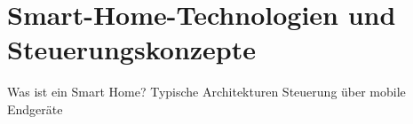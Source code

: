 \section{Smart-Home-Technologien und Steuerungskonzepte} 
Was ist ein Smart Home?
Typische Architekturen
Steuerung über mobile Endgeräte
